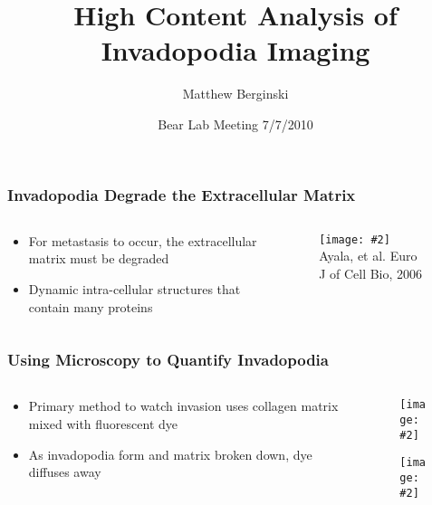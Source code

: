 \documentclass{beamer}
\title[]{High Content Analysis of Invadopodia Imaging}
\author[] %
{Matthew Berginski}
\date[Lab Meeting 7/7/2010]{Bear Lab Meeting 7/7/2010}
\newcommand{\centerfig}[3]{
	\begin{center}
	\begin{figure}[htbp]
	\texttt{[image: \#2]}
	\\{\tiny #3}
	\end{figure}
	\end{center}
}
\begin{document}
\begin{frame}
	\titlepage
\end{frame}

\begin{frame}
	\frametitle{Invadopodia Degrade the Extracellular Matrix}
	\begin{columns}
		\begin{column}{0.5\textwidth}
		\begin{itemize}
		\item For metastasis to occur, the extracellular matrix must be degraded
		\item Dynamic intra-cellular structures that contain many proteins
		\end{itemize}
		\end{column}
		
		\begin{column}{0.5\textwidth}
		\centerfig{width=\textwidth}{figures/invado_sketch.png}{Ayala, et al.
		Euro J of Cell Bio, 2006}
		\end{column}
	\end{columns}
\end{frame}

\begin{frame}
	\frametitle{Using Microscopy to Quantify Invadopodia}
	\begin{columns}
		\begin{column}{0.5\textwidth}
		\begin{itemize}
		\item Primary method to watch invasion uses collagen matrix mixed with
		fluorescent dye
		\item As invadopodia form and matrix broken down, dye diffuses away
		\end{itemize}
		\end{column}
		
		\begin{column}{0.5\textwidth}	
		\centerfig{height=0.4\textheight}{figures/sample_gel}{}
		\centerfig{height=0.4\textheight}{figures/sample_puncta}{}
		\end{column}
	\end{columns}
\end{frame}
\end{document}
